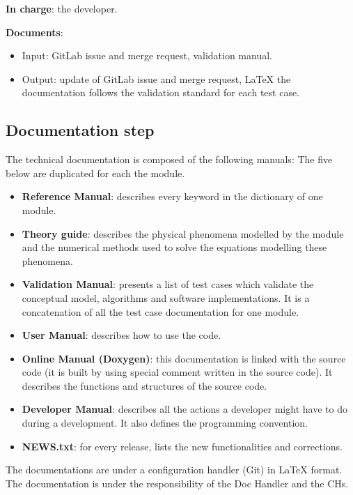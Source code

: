 \textbf{In charge}: the developer.

\textbf{Documents}:
\begin{itemize}
\item Input: GitLab issue and merge request, validation manual.
\item Output: update of GitLab issue and merge request, \LaTeX\xspace the
  documentation follows the validation standard for each test case.
\end{itemize}

\subsection{Documentation step}

The \telemacsystem{} technical documentation is composed of the following manuals:
The five below are duplicated for each the \telemacsystem{} module.
\begin{itemize}
\item \textbf{Reference Manual}: describes every keyword in the dictionary of
  one module.
\item \textbf{Theory guide}: describes the physical phenomena modelled by the
  module and the numerical methods used to solve the equations modelling these
  phenomena.
\item \textbf{Validation Manual}: presents a list of test cases which validate
  the conceptual model, algorithms and software implementations. It is a
  concatenation of all the test case documentation for one module.
\item \textbf{User Manual}: describes how to use the code.
\end{itemize}

\begin{itemize}
\item \textbf{Online Manual (Doxygen)}: this documentation is linked with the
  source code (it is built by using special comment written in the source
  code). It describes the functions and structures of the source code.
\item \textbf{Developer Manual}: describes all the actions a developer might
  have to do during a development. It also defines the programming convention.
\item \textbf{NEWS.txt}: for every release, lists the new functionalities and
  corrections.
\end{itemize}

The documentations are under a configuration handler (Git) in \LaTeX\xspace
format. The documentation is under the responsibility of the Doc Handler and
the CHs.

